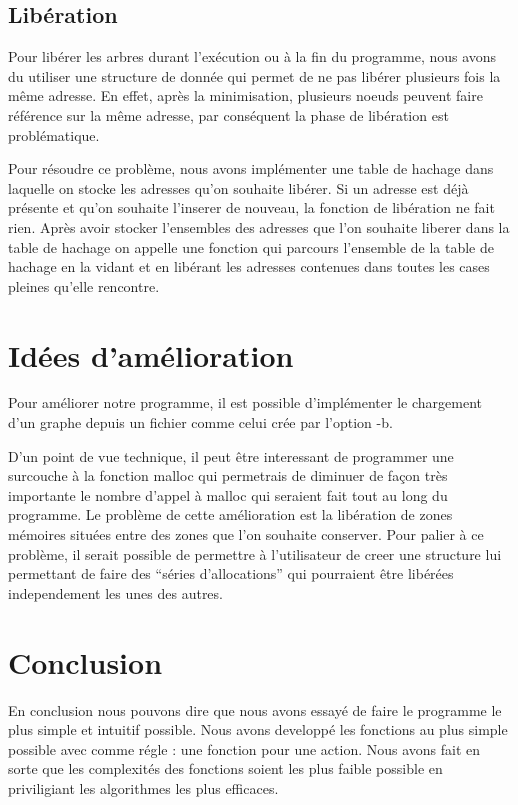 \documentclass[15pt, a4paper]{article}
\begin{document}
\subsection{Libération}

Pour libérer les arbres durant l'exécution ou à la fin du programme, nous avons du
utiliser une structure de donnée qui permet de ne pas libérer plusieurs
fois la même adresse. En effet, après la minimisation, plusieurs noeuds
peuvent faire référence sur la même adresse, par conséquent la phase de
libération est problématique.

\bigskip

Pour résoudre ce problème, nous avons implémenter une table de hachage
dans laquelle on stocke les adresses qu'on souhaite libérer. Si un
adresse est déjà présente et qu'on souhaite l'inserer de nouveau, la
fonction de libération ne fait rien. Après avoir stocker l'ensembles des
adresses que l'on souhaite liberer dans la table de hachage on appelle
une fonction qui parcours l'ensemble de la table de hachage en la vidant
et en libérant les adresses contenues dans toutes les cases pleines
qu'elle rencontre.

\section{Idées d'amélioration}

Pour améliorer notre programme, il est possible d'implémenter le chargement 
d'un graphe depuis un fichier comme celui crée par l'option -b. 

D'un point de vue technique, il peut être interessant de programmer une 
surcouche à la fonction malloc qui permetrais de diminuer de façon très 
importante le nombre d'appel à malloc qui seraient fait tout au long du 
programme. Le problème de cette amélioration est la libération de zones 
mémoires situées entre des zones que l'on souhaite conserver. Pour palier
à ce problème, il serait possible de permettre à l'utilisateur de creer une 
structure lui permettant de faire des ``séries d'allocations'' qui pourraient
être libérées independement les unes des autres. 

\section{Conclusion}
En conclusion nous pouvons dire que nous avons essayé de faire le programme le plus simple et intuitif possible. 
Nous avons developpé les fonctions au plus simple possible avec comme régle : une fonction pour une action. 
Nous avons fait en sorte que les complexités des fonctions soient les plus faible possible en priviligiant 
les algorithmes les plus efficaces.
\end{document}
